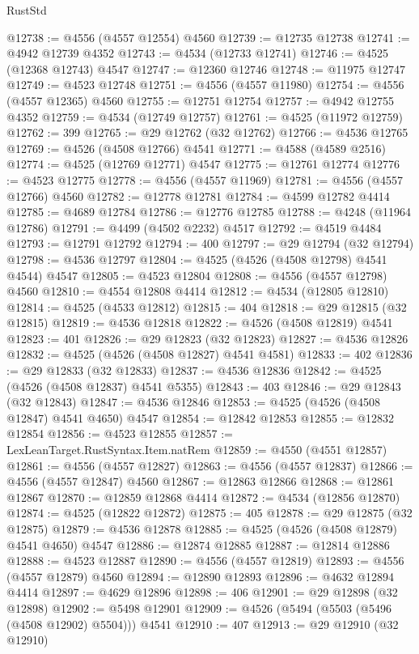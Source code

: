 \begin{lexlean}{RustStd}
\begin{coremodule}
{\begin{coremodule}
{{{{{{{{{{{{{{{{{{{{{{{{{{{{{{{{{{{{{{{{{{{{{{{{{{{{{{{@12738 := @4556 (@4557 @12554) @4560
@12739 := @12735 @12738
@12741 := @4942 @12739 @4352
@12743 := @4534 (@12733 @12741)
@12746 := @4525 (@12368 @12743) @4547
@12747 := @12360 @12746
@12748 := @11975 @12747
@12749 := @4523 @12748
@12751 := @4556 (@4557 @11980)
@12754 := @4556 (@4557 @12365) @4560
@12755 := @12751 @12754
@12757 := @4942 @12755 @4352
@12759 := @4534 (@12749 @12757)
@12761 := @4525 (@11972 @12759)
@12762 := 399
@12765 := @29 @12762 (@32 @12762)
@12766 := @4536 @12765
@12769 := @4526 (@4508 @12766) @4541
@12771 := @4588 (@4589 @2516)
@12774 := @4525 (@12769 @12771) @4547
@12775 := @12761 @12774
@12776 := @4523 @12775
@12778 := @4556 (@4557 @11969)
@12781 := @4556 (@4557 @12766) @4560
@12782 := @12778 @12781
@12784 := @4599 @12782 @4414
@12785 := @4689 @12784
@12786 := @12776 @12785
@12788 := @4248 (@11964 @12786)
@12791 := @4499 (@4502 @2232) @4517
@12792 := @4519 @4484
@12793 := @12791 @12792
@12794 := 400
@12797 := @29 @12794 (@32 @12794)
@12798 := @4536 @12797
@12804 := @4525 (@4526 (@4508 @12798) @4541 @4544) @4547
@12805 := @4523 @12804
@12808 := @4556 (@4557 @12798) @4560
@12810 := @4554 @12808 @4414
@12812 := @4534 (@12805 @12810)
@12814 := @4525 (@4533 @12812)
@12815 := 404
@12818 := @29 @12815 (@32 @12815)
@12819 := @4536 @12818
@12822 := @4526 (@4508 @12819) @4541
@12823 := 401
@12826 := @29 @12823 (@32 @12823)
@12827 := @4536 @12826
@12832 := @4525 (@4526 (@4508 @12827) @4541 @4581)
@12833 := 402
@12836 := @29 @12833 (@32 @12833)
@12837 := @4536 @12836
@12842 := @4525 (@4526 (@4508 @12837) @4541 @5355)
@12843 := 403
@12846 := @29 @12843 (@32 @12843)
@12847 := @4536 @12846
@12853 := @4525 (@4526 (@4508 @12847) @4541 @4650) @4547
@12854 := @12842 @12853
@12855 := @12832 @12854
@12856 := @4523 @12855
@12857 := LexLeanTarget.RustSyntax.Item.natRem
@12859 := @4550 (@4551 @12857)
@12861 := @4556 (@4557 @12827)
@12863 := @4556 (@4557 @12837)
@12866 := @4556 (@4557 @12847) @4560
@12867 := @12863 @12866
@12868 := @12861 @12867
@12870 := @12859 @12868 @4414
@12872 := @4534 (@12856 @12870)
@12874 := @4525 (@12822 @12872)
@12875 := 405
@12878 := @29 @12875 (@32 @12875)
@12879 := @4536 @12878
@12885 := @4525 (@4526 (@4508 @12879) @4541 @4650) @4547
@12886 := @12874 @12885
@12887 := @12814 @12886
@12888 := @4523 @12887
@12890 := @4556 (@4557 @12819)
@12893 := @4556 (@4557 @12879) @4560
@12894 := @12890 @12893
@12896 := @4632 @12894 @4414
@12897 := @4629 @12896
@12898 := 406
@12901 := @29 @12898 (@32 @12898)
@12902 := @5498 @12901
@12909 := @4526 (@5494 (@5503 (@5496 (@4508 @12902) @5504))) @4541
@12910 := 407
@12913 := @29 @12910 (@32 @12910)
}}}}}}}}}}}}}}}}}}}}}}}}}}}}}}}}}}}}}}}}}}}}}}}}}}}}}}}
\end{coremodule}}
\end{coremodule}
\end{lexlean}
